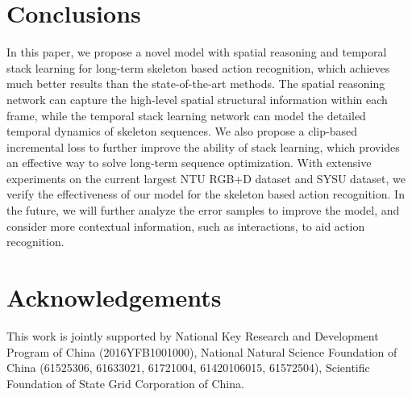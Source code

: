 \documentclass[runningheads]{llncs}
\begin{document}
\section{Conclusions}
\label{Conclusions}

In this paper, we propose a novel model with spatial reasoning and temporal stack learning for long-term skeleton based action recognition, which achieves much better results than the state-of-the-art methods. The spatial reasoning network can capture the high-level spatial structural information within each frame, while the temporal stack learning network can model the detailed temporal dynamics of skeleton sequences. We also propose a clip-based incremental loss to further improve the ability of stack learning, which provides an effective way to solve long-term sequence optimization. With extensive experiments on the current largest NTU RGB+D dataset and SYSU dataset, we verify the effectiveness of our model for the skeleton based action recognition. In the future, we will further analyze the error samples to improve the model, and consider more contextual information, such as interactions, to aid action recognition.


\section*{Acknowledgements}
\label{ Acknowledgements}

This work is jointly supported by National Key Research and Development Program of China (2016YFB1001000), National Natural Science Foundation of China (61525306, 61633021, 61721004, 61420106015, 61572504), Scientific Foundation of State Grid Corporation of China.



\clearpage



\end{document}
